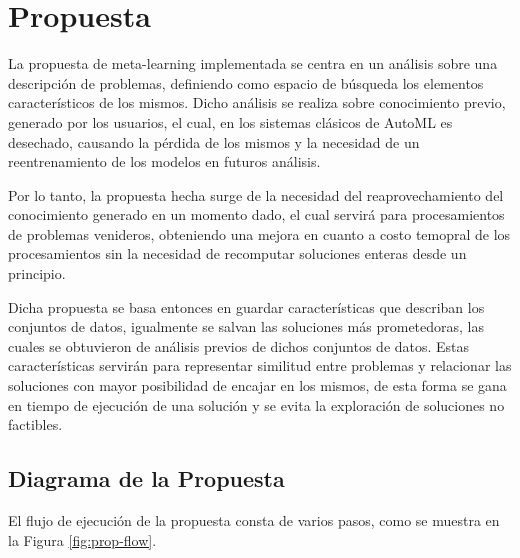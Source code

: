\chapter{Propuesta}\label{chapter:proposal}


La propuesta de meta-learning implementada se centra en un análisis sobre
una descripción de problemas, definiendo como espacio de búsqueda los elementos
característicos de los mismos. Dicho análisis se realiza sobre conocimiento
previo, generado por los usuarios, el cual, en los sistemas clásicos de AutoML
es desechado, causando la pérdida de los mismos y la necesidad de un
reentrenamiento de los modelos en futuros análisis.

Por lo tanto, la propuesta hecha surge de la necesidad del reaprovechamiento
del conocimiento generado en un momento dado, el cual servirá para
procesamientos de problemas venideros, obteniendo una mejora en cuanto a costo
temopral de los procesamientos sin la necesidad de recomputar soluciones
enteras desde un principio.


Dicha propuesta se basa entonces en guardar características que describan los
conjuntos de datos, igualmente se salvan las soluciones más prometedoras, las
cuales se obtuvieron de análisis previos de dichos conjuntos de datos. Estas
características servirán para representar similitud entre problemas y
relacionar las soluciones con mayor posibilidad de encajar en los mismos, de
esta forma se gana en tiempo de ejecución de una solución y se evita la
exploración de soluciones no factibles.


\section{Diagrama de la Propuesta}


El flujo de ejecución de la propuesta consta de varios pasos, como se muestra
en la Figura \ref{fig:prop-flow}.

